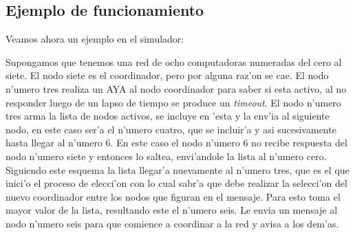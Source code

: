 \newpage
\subsection{Ejemplo de funcionamiento}
Veamos ahora un ejemplo en el simulador:

Supongamos que tenemos una red de ocho computadoras numeradas del cero al
siete. El nodo siete es el coordinador, pero por alguna raz'on se cae. El nodo n'umero tres realiza un AYA al nodo coordinador para saber
si esta activo, al no responder luego de un lapso de tiempo se produce un
\emph{timeout}. El  nodo n'umero tres arma la lista de nodos activos, se incluye
en 'esta y la env'ia al siguiente nodo, en este caso ser'a el n'umero cuatro, que
se incluir'a y asi sucesivamente hasta llegar al n'umero 6. En este caso el
nodo n'umero 6 no recibe respuesta del nodo n'umero siete y entonces lo saltea,
envi'andole la lista al n'umero cero. Siguiendo este esquema la lista llegar'a
nuevamente al n'umero tres, que es el que inici'o el proceso de elecci'on con
lo cual sabr'a que debe realizar la selecci'on del nuevo coordinador entre los
nodos que figuran en el mensaje. Para esto toma el mayor valor de la lista,
resultando este el n'umero seis. Le envia un mensaje al nodo n'umero seis para
que comience a coordinar a la red y avisa a los dem'as.


